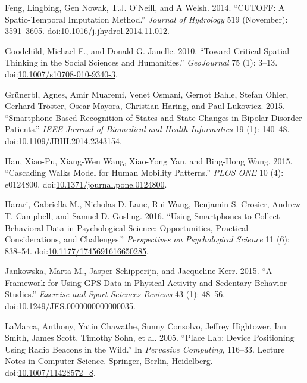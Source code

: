 \documentclass[]{article}
\begin{document}
\hypertarget{ref-feng_cutoff:_2014}{}
Feng, Lingbing, Gen Nowak, T.J. O'Neill, and A Welsh. 2014. ``CUTOFF: A
Spatio-Temporal Imputation Method.'' \emph{Journal of Hydrology} 519
(November): 3591--3605.
doi:\href{https://doi.org/10.1016/j.jhydrol.2014.11.012}{10.1016/j.jhydrol.2014.11.012}.

\hypertarget{ref-goodchild_toward_2010}{}
Goodchild, Michael F., and Donald G. Janelle. 2010. ``Toward Critical
Spatial Thinking in the Social Sciences and Humanities.''
\emph{GeoJournal} 75 (1): 3--13.
doi:\href{https://doi.org/10.1007/s10708-010-9340-3}{10.1007/s10708-010-9340-3}.

\hypertarget{ref-grunerbl_smartphone-based_2015}{}
Grünerbl, Agnes, Amir Muaremi, Venet Osmani, Gernot Bahle, Stefan Ohler,
Gerhard Tröster, Oscar Mayora, Christian Haring, and Paul Lukowicz.
2015. ``Smartphone-Based Recognition of States and State Changes in
Bipolar Disorder Patients.'' \emph{IEEE Journal of Biomedical and Health
Informatics} 19 (1): 140--48.
doi:\href{https://doi.org/10.1109/JBHI.2014.2343154}{10.1109/JBHI.2014.2343154}.

\hypertarget{ref-han_cascading_2015}{}
Han, Xiao-Pu, Xiang-Wen Wang, Xiao-Yong Yan, and Bing-Hong Wang. 2015.
``Cascading Walks Model for Human Mobility Patterns.'' \emph{PLOS ONE}
10 (4): e0124800.
doi:\href{https://doi.org/10.1371/journal.pone.0124800}{10.1371/journal.pone.0124800}.

\hypertarget{ref-harari_using_2016}{}
Harari, Gabriella M., Nicholas D. Lane, Rui Wang, Benjamin S. Crosier,
Andrew T. Campbell, and Samuel D. Gosling. 2016. ``Using Smartphones to
Collect Behavioral Data in Psychological Science: Opportunities,
Practical Considerations, and Challenges.'' \emph{Perspectives on
Psychological Science} 11 (6): 838--54.
doi:\href{https://doi.org/10.1177/1745691616650285}{10.1177/1745691616650285}.

\hypertarget{ref-jankowska_framework_2015}{}
Jankowska, Marta M., Jasper Schipperijn, and Jacqueline Kerr. 2015. ``A
Framework for Using GPS Data in Physical Activity and Sedentary Behavior
Studies.'' \emph{Exercise and Sport Sciences Reviews} 43 (1): 48--56.
doi:\href{https://doi.org/10.1249/JES.0000000000000035}{10.1249/JES.0000000000000035}.

\hypertarget{ref-lamarca_place_2005}{}
LaMarca, Anthony, Yatin Chawathe, Sunny Consolvo, Jeffrey Hightower, Ian
Smith, James Scott, Timothy Sohn, et al. 2005. ``Place Lab: Device
Positioning Using Radio Beacons in the Wild.'' In \emph{Pervasive
Computing}, 116--33. Lecture Notes in Computer Science. Springer,
Berlin, Heidelberg.
doi:\href{https://doi.org/10.1007/11428572_8}{10.1007/11428572\_8}.
\end{document}
